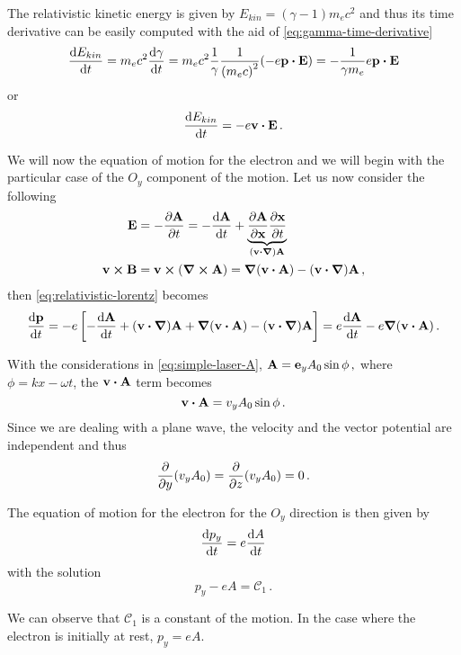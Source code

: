 \documentclass[12pt, class=report, crop=false]{standalone}
\begin{document}
The relativistic kinetic energy is given by \(E_{kin}=(\gamma-1)m_e c^2\) and
thus its time derivative can be easily computed with the aid of
\cref{eq:gamma-time-derivative}
\[
\dv{E_{kin}}{t} = m_e c^2 \dv{\gamma}{t} =
m_e c^2 \frac{1}{\gamma} \frac{1}{{(m_e c)}^2} (-e\vb{p}\vdot\vb{E}) =
-\frac{1}{\gamma m_e} e \vb{p}\vdot\vb{E}
\]
or
\begin{equation}
  \label{eq:e-kin-deriv}
  \dv{E_{kin}}{t} = -e \vb{v}\vdot\vb{E}\,.
\end{equation}


We will now the equation of motion for the electron and we will begin with the
particular case of the \(O_y\) component of the motion.
Let us now consider the following
\[
\begin{aligned}
  \vb{E} &= -\pdv{\vb{A}}{t} = -\dv{\vb{A}}{t} +
    \underbrace{\pdv{\vb{A}}{\vb{x}}\pdv{\vb{x}}{t}}_{\left(\vb{v}\vdot\vb*{\nabla}\right)\vb{A}} \\
  \vb{v}\cp\vb{B} &= \vb{v} \cp (\curl{\vb{A}}) = \grad{(\vb{v}\vdot\vb{A})} -
    (\vb{v}\vdot\vb*{\nabla})\vb{A}\,,
\end{aligned}
\]
then \cref{eq:relativistic-lorentz} becomes
\[
\dv{\vb{p}}{t} = -e \left[-\dv{\vb{A}}{t}+(\vb{v}\vdot\vb*{\nabla})\vb{A}+
  \grad{(\vb{v}\vdot\vb{A})}-(\vb{v}\vdot\vb*{\nabla})\vb{A}\right]=
e\dv{\vb{A}}{t}-e\grad{(\vb{v}\vdot\vb{A})}\,.
\]

With the considerations in \cref{eq:simple-laser-A},
\(
\vb{A} = \vb{e}_y A_0 \sin{\phi}\,,
\)
where \(\phi=kx-\omega t\), the \(\vb{v}\vdot\vb{A}\) term becomes
\[
\vb{v}\vdot\vb{A} = v_y A_0 \sin{\phi}\,.
\]
Since we are dealing with a plane wave, the velocity and the vector potential
are independent and thus
\[
\pdv{y}(v_y A_0) = \pdv{z}(v_y A_0) = 0\,.
\]

The equation of motion for the electron for the \(O_y\) direction is then given by
\[
\dv{p_y}{t} = e \dv{A}{t}
\]
with the solution
\begin{equation}
  \label{eq:py-C1}
  p_y - eA = \mathcal{C}_1\,.
\end{equation}

We can observe that \(\mathcal{C}_1\) is a constant of the motion. In the case where
the electron is initially at rest, \(p_y=eA\).
\end{document}
